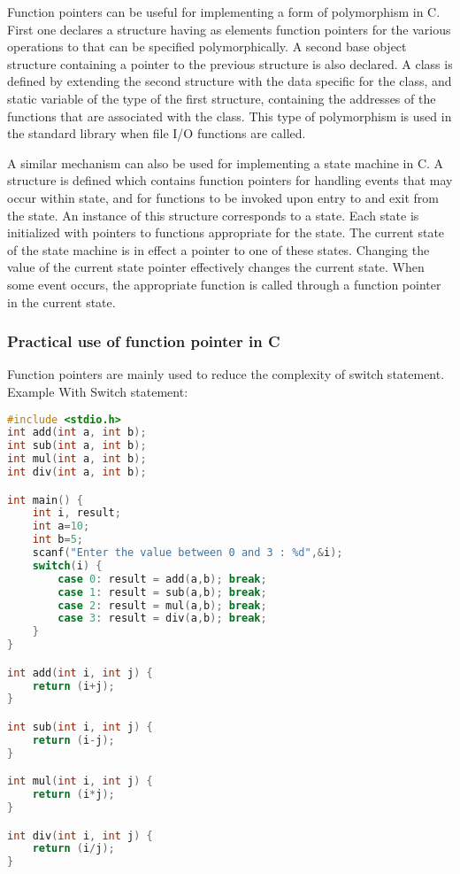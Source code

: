 Function pointers can be useful for implementing a form of polymorphism in C.
First one declares a structure having as elements function pointers for the
various operations to that can be specified polymorphically. A second base
object structure containing a pointer to the previous structure is also
declared. A class is defined by extending the second structure with the data
specific for the class, and static variable of the type of the first structure,
containing the addresses of the functions that are associated with the class.
This type of polymorphism is used in the standard library when file I/O
functions are called.

A similar mechanism can also be used for implementing a state machine in C. A
structure is defined which contains function pointers for handling events that
may occur within state, and for functions to be invoked upon entry to and exit
from the state. An instance of this structure corresponds to a state. Each
state is initialized with pointers to functions appropriate for the state. The
current state of the state machine is in effect a pointer to one of these
states. Changing the value of the current state pointer effectively changes the
current state. When some event occurs, the appropriate function is called
through a function pointer in the current state.

\subsubsection{Practical use of function pointer in C}
Function pointers are mainly used to reduce the complexity of switch statement.
Example With Switch statement: 
\lstset{basicstyle=\scriptsize, numbers=left, captionpos=b, tabsize=4}
\begin{lstlisting}[caption=Section \thesection listing \arabic{pntcnt},language={C},
breaklines=true,xleftmargin=15pt,label=lst:section\thesection listing\arabic{pntcnt}]
#include <stdio.h>
int add(int a, int b);
int sub(int a, int b);
int mul(int a, int b);
int div(int a, int b);

int main() {
	int i, result;
	int a=10;
	int b=5;
	scanf("Enter the value between 0 and 3 : %d",&i); 
	switch(i) {
		case 0: result = add(a,b); break;
		case 1: result = sub(a,b); break;
		case 2: result = mul(a,b); break;
		case 3: result = div(a,b); break;
	}
}

int add(int i, int j) {
	return (i+j);
}

int sub(int i, int j) {
	return (i-j);
}

int mul(int i, int j) {
	return (i*j);
}

int div(int i, int j) {
	return (i/j);
}
\end{lstlisting}

